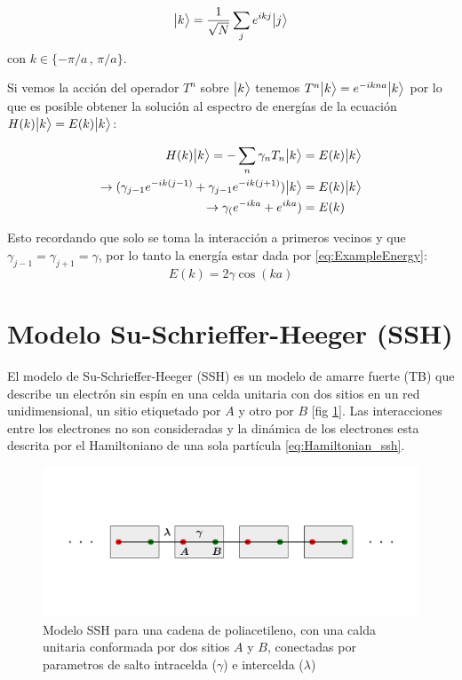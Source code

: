    \begin{equation}
        \label{eq:BlochFunctions}
        \big |{k}\big \rangle = \frac{1}{\sqrt{N}} \sum_j e^{ikj} \big |{j}\big \rangle 
    \end{equation}
    con $k \in \{-\pi/a\,,\,\pi/a\}$.
    
    Si vemos la acción del operador $T^n$ sobre $\big |{k}\big \rangle$ tenemos $T^n \big |{k}\big \rangle =  e^{-ikna}\big |{k}\big \rangle$ 
    por lo que es posible obtener la solución al espectro de energías de la ecuación $H(k)\big |{k}\big \rangle = E(k)\big |{k}\big \rangle$:
    
    \begin{align}
       \nonumber H(k) \big |{k}\big \rangle = -\sum_n \gamma_n T_n \big |{k}\big \rangle &= E(k) \big |{k}\big \rangle\\
       \nonumber  \rightarrow (\gamma_{j-1} e^{-ik(j-1)}  + \gamma_{j-1} e^{-ik(j+1)})\big |{k}\big \rangle &= E(k) \big |{k}\big \rangle \\ 
       \nonumber  \rightarrow \gamma_( e^{-ika}  +  e^{ika}) &= E(k)
    \end{align}
    
    Esto recordando que solo se toma la interacción a primeros vecinos y que $\gamma_{j-1} =\gamma_{j+1} = \gamma $, por lo tanto la energía estar dada por \eqref{eq:ExampleEnergy}:
    \begin{equation}
        \label{eq:ExampleEnergy}
        E(k) = 2\gamma \cos(ka)
    \end{equation}
    
\section{Modelo Su-Schrieffer-Heeger (SSH)}
    

El modelo de Su-Schrieffer-Heeger (SSH) es un modelo de amarre fuerte (TB) que describe un electrón sin espín en una celda unitaria con dos sitios en un red unidimensional, un sitio etiquetado por $A$ y otro por $B$ [fig \ref{fig:SSH_Fig}]. Las interacciones entre los electrones no son consideradas y la dinámica de los electrones esta descrita por el Hamiltoniano de una sola partícula \eqref{eq:Hamiltonian_ssh}.

\begin{figure}[tbh!]
    \centering
    \includegraphics[width=\textwidth]{Imagenes/Models/SSH_example.pdf}\vspace{-1.5cm}
    \caption{Modelo SSH para una cadena de poliacetileno, con una calda unitaria conformada por dos sitios $A$ y $B$, conectadas por parametros de salto intracelda ($\gamma$) e intercelda ($\lambda$)}
    \label{fig:SSH_Fig}
\end{figure}


